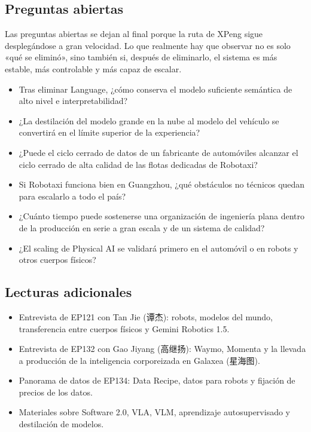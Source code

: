 \subsection{Preguntas abiertas}

Las preguntas abiertas se dejan al final porque la ruta de XPeng sigue desplegándose a gran velocidad. Lo que realmente hay que observar no es solo «qué se eliminó», sino también si, después de eliminarlo, el sistema es más estable, más controlable y más capaz de escalar.

\begin{itemize}
\item Tras eliminar Language, ¿cómo conserva el modelo suficiente semántica de alto nivel e interpretabilidad?
\item ¿La destilación del modelo grande en la nube al modelo del vehículo se convertirá en el límite superior de la experiencia?
\item ¿Puede el ciclo cerrado de datos de un fabricante de automóviles alcanzar el ciclo cerrado de alta calidad de las flotas dedicadas de Robotaxi?
\item Si Robotaxi funciona bien en Guangzhou, ¿qué obstáculos no técnicos quedan para escalarlo a todo el país?
\item ¿Cuánto tiempo puede sostenerse una organización de ingeniería plana dentro de la producción en serie a gran escala y de un sistema de calidad?
\item ¿El scaling de Physical AI se validará primero en el automóvil o en robots y otros cuerpos físicos?
\end{itemize}

\subsection{Lecturas adicionales}

\begin{itemize}
\item Entrevista de EP121 con Tan Jie (谭杰): robots, modelos del mundo, transferencia entre cuerpos físicos y Gemini Robotics 1.5.
\item Entrevista de EP132 con Gao Jiyang (高继扬): Waymo, Momenta y la llevada a producción de la inteligencia corporeizada en Galaxea (星海图).
\item Panorama de datos de EP134: Data Recipe, datos para robots y fijación de precios de los datos.
\item Materiales sobre Software 2.0, VLA, VLM, aprendizaje autosupervisado y destilación de modelos.
\end{itemize}

